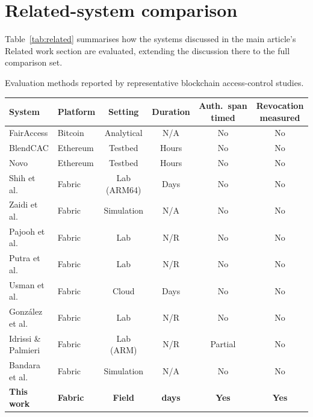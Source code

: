 \section{Related-system comparison}
\label{sec:supp_related}

Table~\ref{tab:related} summarises how the systems discussed in the main
article's Related work section are evaluated, extending the discussion
there to the full comparison set.

\begin{widetab}
\caption{Evaluation methods reported by representative blockchain access-control studies.}
\label{tab:related}
\small
\begin{tabularx}{\tblwidth}{@{}l l c c c C@{}}
\toprule
System & Platform & Setting & Duration & Auth.\ span timed & Revocation measured \\
\midrule
FairAccess \cite{ouaddah2016fairaccess}   & Bitcoin  & Analytical & N/A   & No & No \\
BlendCAC \cite{xu2018blendcac}            & Ethereum & Testbed    & Hours & No & No \\
Novo \cite{novo2018blockchain}            & Ethereum & Testbed    & Hours & No & No \\
Shih et al.\ \cite{shih2022iiot}          & Fabric   & Lab (ARM64)& Days  & No & No \\
Zaidi et al.\ \cite{zaidi2023fabrication} & Fabric   & Simulation & N/A   & No & No \\
Pajooh et al.\ \cite{pajooh2022fabric_iot}& Fabric   & Lab        & N/R   & No & No \\
Putra et al.\ \cite{putra2021trust}       & Fabric   & Lab        & N/R   & No & No \\
Usman et al.\ \cite{usman2024blockchain}  & Fabric   & Cloud      & Days  & No & No \\
Gonz\'{a}lez et al.\ \cite{gonzalez2023marketplace} & Fabric & Lab & N/R & No & No \\
Idrissi \& Palmieri \cite{idrissi2024blockchain_jsupercomput}
                                          & Fabric   & Lab (ARM)  & N/R   & Partial & No \\
Bandara et al.\ \cite{bandara2021modeling}& Fabric   & Simulation & N/A   & No & No \\
\textbf{This work}                        & \textbf{Fabric} &
  \textbf{Field} & \textbf{\DeployDays{} days} & \textbf{Yes} & \textbf{Yes} \\
\bottomrule
\end{tabularx}
\end{widetab}

